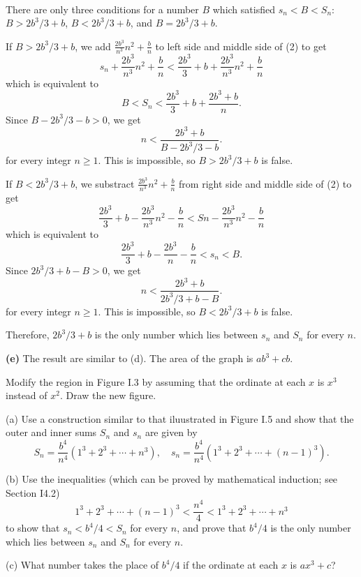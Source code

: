\begin{solution}{\ \\}
  There are only three conditions for a number $B$ which satisfied $s_n < B < S_n$: $B > 2b^3/3 + b$, $B < 2b^3/3 + b$, and $B = 2b^3/3 + b$.

  If $B > 2b^3/3 + b$, we add $\frac{2b^3}{n^3}n^2 + \frac{b}{n}$ to left side and middle side of (2) to get
  \[
  s_n + \frac{2b^3}{n^3}n^2 + \frac{b}{n} < \frac{2b^3}{3} + b + \frac{2b^3}{n^3}n^2 + \frac{b}{n}
  \]
  which is equivalent to
  \[
  B < S_n < \frac{2b^3}{3} + b + \frac{2b^3 + b}{n}.
  \]
  Since $B - 2b^3/3 - b > 0$, we get
  \[
  n < \frac{2b^3 + b}{B - 2b^3/3 - b}.
  \]
  for every integr $n \ge 1$. This is impossible, so $B > 2b^3/3 + b$ is false.

  If $B < 2b^3/3 + b$, we substract $\frac{2b^3}{n^3}n^2 + \frac{b}{n}$ from right side and middle side of (2) to get
  \[
  \frac{2b^3}{3} + b - \frac{2b^3}{n^3}n^2 - \frac{b}{n} < Sn - \frac{2b^3}{n^3}n^2 - \frac{b}{n}
  \]
  which is equivalent to
  \[
  \frac{2b^3}{3} + b - \frac{2b^3}{n} - \frac{b}{n} < s_n < B.
  \]
  Since $2b^3/3 + b - B > 0$, we get
  \[
  n < \frac{2b^3 + b}{2b^3/3 + b - B}.
  \]
  for every integr $n \ge 1$. This is impossible, so $B < 2b^3/3 + b$ is false.

  Therefore, $2b^3/3 + b$ is the only number which lies between $s_n$ and $S_n$ for every $n$.

  \vspace{2\baselineskip}
  \textbf{(e)} The result are similar to (d). The area of the graph is $ab^3 + cb$.
\end{solution}


\begin{exercise}\label{ex:2}
  Modify the region in Figure I.3 by assuming that the ordinate at each $x$ is $x^3$ instead of $x^2$.
  Draw the new figure.

  (a) Use a construction similar to that iluustrated in Figure I.5 and show that the outer and inner
  sums $S_n$ and $s_n$ are given by
  \[
  S_n = \frac{b^4}{n^4} \left( 1^3 + 2^3 + \cdots + n^3 \right), \quad s_n = \frac{b^4}{n^4} \left( 1^3 + 2^3 + \cdots + (n-1)^3 \right).
  \]

  (b) Use the inequalities (which can be proved by mathematical induction; see Section I4.2)
  \[
  \tag{I.12} 1^3 + 2^3 + \cdots + (n - 1)^3 < \frac{n^4}{4} < 1^3 + 2^3 + \cdots + n^3
  \]
  to show that $s_n < b^4 /4 < S_n$ for every $n$, and prove that $b^4/4$ is the only number which lies between $s_n$ and $S_n$ for every $n$.

  (c) What number takes the place of $b^4/4$ if the ordinate at each $x$ is $ax^3+c$?
\end{exercise}

